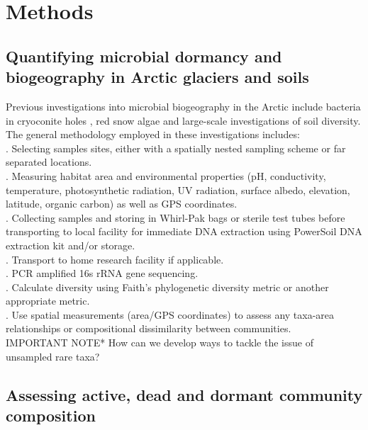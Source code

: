 \chapter{Methods}

\section{Quantifying microbial dormancy and biogeography in Arctic glaciers and soils}

Previous investigations into microbial biogeography in the Arctic include bacteria in cryoconite holes \cite{darcy2018island}, red snow algae \cite{lutz2016biogeography} and large-scale investigations of soil diversity. \\

\noindent The general methodology employed in these investigations includes:\\
. Selecting samples sites, either with a spatially nested sampling scheme or far separated locations.\\
. Measuring habitat area and environmental properties (pH, conductivity, temperature, photosynthetic radiation, UV radiation, surface albedo, elevation, latitude, organic carbon) as well as GPS coordinates.\\
. Collecting samples and storing in Whirl-Pak bags or sterile test tubes before transporting to local facility for immediate DNA extraction using PowerSoil DNA extraction kit and/or storage.\\
. Transport to home research facility if applicable.\\
. PCR amplified 16s rRNA gene sequencing. \\
. Calculate diversity using Faith's phylogenetic diversity metric or another appropriate metric.\\
. Use spatial measurements (area/GPS coordinates) to assess any taxa-area relationships or compositional dissimilarity between communities.\\

\noindent *IMPORTANT NOTE* How can we develop ways to tackle the issue of unsampled rare taxa? \cite{woodcock2006taxa}

\section{Assessing active, dead and dormant community composition}

